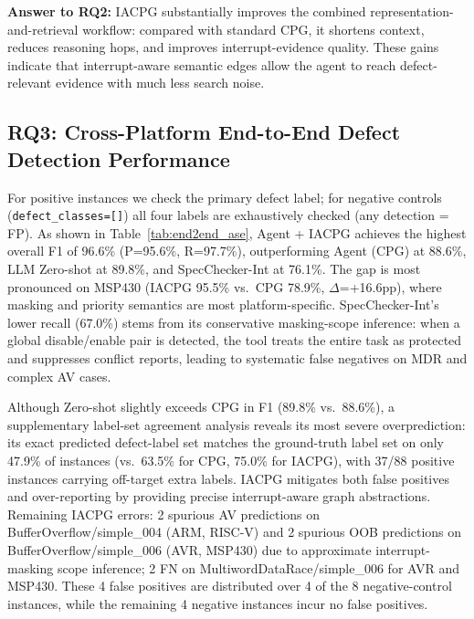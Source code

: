 \documentclass[a4paper,UKenglish,cleveref, autoref, thm-restate]{lipics-v2021}
\begin{document}
\begin{rqbox}
\textbf{Answer to RQ2:}
IACPG substantially improves the combined representation-and-retrieval workflow: compared with standard CPG, it shortens context, reduces reasoning hops, and improves interrupt-evidence quality. These gains indicate that interrupt-aware semantic edges allow the agent to reach defect-relevant evidence with much less search noise.
\end{rqbox}


\subsection{RQ3: Cross-Platform End-to-End Defect Detection Performance}

For positive instances we check the primary defect label; for negative controls (\texttt{defect\_classes=[]}) all four labels are exhaustively checked (any detection = FP). As shown in Table~\ref{tab:end2end_ase}, Agent + IACPG achieves the highest overall F1 of 96.6\% (P=95.6\%, R=97.7\%), outperforming Agent (CPG) at 88.6\%, LLM Zero-shot at 89.8\%, and SpecChecker-Int at 76.1\%. The gap is most pronounced on MSP430 (IACPG 95.5\% vs.\ CPG 78.9\%, $\Delta$=+16.6pp), where masking and priority semantics are most platform-specific. SpecChecker-Int's lower recall (67.0\%) stems from its conservative masking-scope inference: when a global disable/enable pair is detected, the tool treats the entire task as protected and suppresses conflict reports, leading to systematic false negatives on MDR and complex AV cases.

Although Zero-shot slightly exceeds CPG in F1 (89.8\% vs.\ 88.6\%), a supplementary label-set agreement analysis reveals its most severe overprediction: its exact predicted defect-label set matches the ground-truth label set on only 47.9\% of instances (vs.\ 63.5\% for CPG, 75.0\% for IACPG), with 37/88 positive instances carrying off-target extra labels. IACPG mitigates both false positives and over-reporting by providing precise interrupt-aware graph abstractions. Remaining IACPG errors: 2 spurious AV predictions on BufferOverflow/simple\_004 (ARM, RISC-V) and 2 spurious OOB predictions on BufferOverflow/simple\_006 (AVR, MSP430) due to approximate interrupt-masking scope inference; 2 FN on MultiwordDataRace/simple\_006 for AVR and MSP430. These 4 false positives are distributed over 4 of the 8 negative-control instances, while the remaining 4 negative instances incur no false positives.
\end{document}
